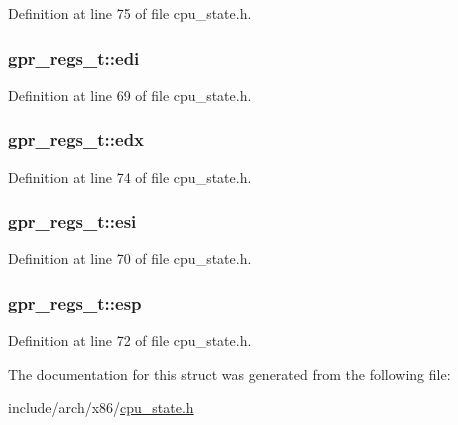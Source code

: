 \-Definition at line 75 of file cpu\-\_\-state.\-h.

\hypertarget{structgpr__regs__t_a7598e52ec6dadbdf3816e40669fe09f5}{
\subsubsection[{edi}]{ {\bf gpr\-\_\-regs\-\_\-t\-::edi}}}\label{structgpr__regs__t_a7598e52ec6dadbdf3816e40669fe09f5}


\-Definition at line 69 of file cpu\-\_\-state.\-h.

\hypertarget{structgpr__regs__t_a2df25d130fd9d71daead322610397811}{
\subsubsection[{edx}]{ {\bf gpr\-\_\-regs\-\_\-t\-::edx}}}\label{structgpr__regs__t_a2df25d130fd9d71daead322610397811}


\-Definition at line 74 of file cpu\-\_\-state.\-h.

\hypertarget{structgpr__regs__t_a73a5061b1eb039e13ad92acdbf4f22f7}{
\subsubsection[{esi}]{ {\bf gpr\-\_\-regs\-\_\-t\-::esi}}}\label{structgpr__regs__t_a73a5061b1eb039e13ad92acdbf4f22f7}


\-Definition at line 70 of file cpu\-\_\-state.\-h.

\hypertarget{structgpr__regs__t_a607d89c914c7005254baa186f567d337}{
\subsubsection[{esp}]{ {\bf gpr\-\_\-regs\-\_\-t\-::esp}}}\label{structgpr__regs__t_a607d89c914c7005254baa186f567d337}


\-Definition at line 72 of file cpu\-\_\-state.\-h.



\-The documentation for this struct was generated from the following file\-:\begin{DoxyCompactItemize}
\item 
include/arch/x86/\hyperlink{cpu__state_8h}{cpu\-\_\-state.\-h}\end{DoxyCompactItemize}
